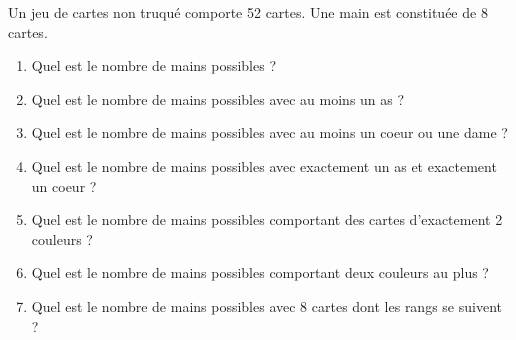 \documentclass[a4paper, 11pt]{article}
\begin{document}
\begin{exercice}  \;
	Un jeu de cartes non truqu\'e comporte 52 cartes. Une main est constitu\'ee de 8 cartes.
	\begin{enumerate}
		\item Quel est le nombre de mains possibles ?
		\item Quel est le nombre de mains possibles avec au moins un as ?
		\item Quel est le nombre de mains possibles avec au moins un coeur ou une dame ?
		\item Quel est le nombre de mains possibles avec exactement un as et exactement un coeur ?
		\item Quel est le nombre de mains possibles comportant des cartes d'exactement 2 couleurs ?
		\item  Quel est le nombre de mains possibles comportant deux couleurs au plus ?
		\item Quel est le nombre de mains possibles avec 8 cartes dont les rangs se suivent ?
	\end{enumerate}
\end{exercice}
\end{document}
